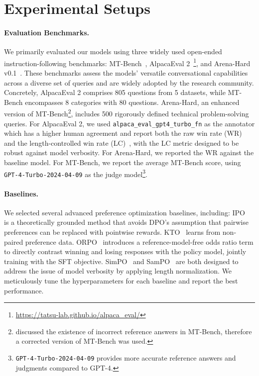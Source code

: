 \newpage
\appendix

\section{Experimental Setups}
\label{appendix:exp_setup}

\paragraph{Evaluation Benchmarks.} We primarily evaluated our models using three widely used open-ended instruction-following benchmarks: MT-Bench~\citep{zheng2023judging}, AlpacaEval 2~\citep{AlpacaEval}\footnote{\url{https://tatsu-lab.github.io/alpaca_eval/}}, and Arena-Hard v0.1~\citep{arenahard2024}. These benchmarks assess the models' versatile conversational capabilities across a diverse set of queries and are widely adopted by the research community. Concretely, AlpacaEval 2 comprises 805 questions from 5 datasets, while MT-Bench encompasses 8 categories with 80 questions. Arena-Hard, an enhanced version of MT-Bench\footnote{\citet{Adler2024Nemotron} discussed the existence of incorrect reference answers in MT-Bench, therefore a corrected version of MT-Bench was used.}, includes 500 rigorously defined technical problem-solving queries. 
For AlpacaEval 2, we used \texttt{alpaca\_eval\_gpt4\_turbo\_fn} as the annotator which has a higher human agreement and report both the raw win rate (WR) and the length-controlled win rate (LC)~\citep{dubois2024length}, with the LC metric designed to be robust against model verbosity. For Arena-Hard, we reported the WR against the baseline model. For MT-Bench, we report the average MT-Bench score, using \texttt{GPT-4-Turbo-2024-04-09} as the judge model\footnote{\texttt{GPT-4-Turbo-2024-04-09} provides more accurate reference answers and judgments compared to GPT-4.}.

\vspace{-0.25cm}
\paragraph{Baselines.} We selected several advanced preference optimization baselines, including: 
IPO~\citep{Azar2023AGT} is a theoretically grounded method that avoids DPO's assumption that pairwise preferences can be replaced with pointwise rewards. 
KTO~\citep{Ethayarajh2024KTOMA} learns from non-paired preference data. ORPO~\citep{Hong2024ORPOMP} introduces a reference-model-free odds ratio term to directly contrast winning and losing responses with the policy model, jointly training with the SFT objective. SimPO~\citep{Meng2024SimPO} and SamPO~\citep{lu2024sampo} are both designed to address the issue of model verbosity by applying length normalization. 
We meticulously tune the hyperparameters for each baseline and report the best performance.

